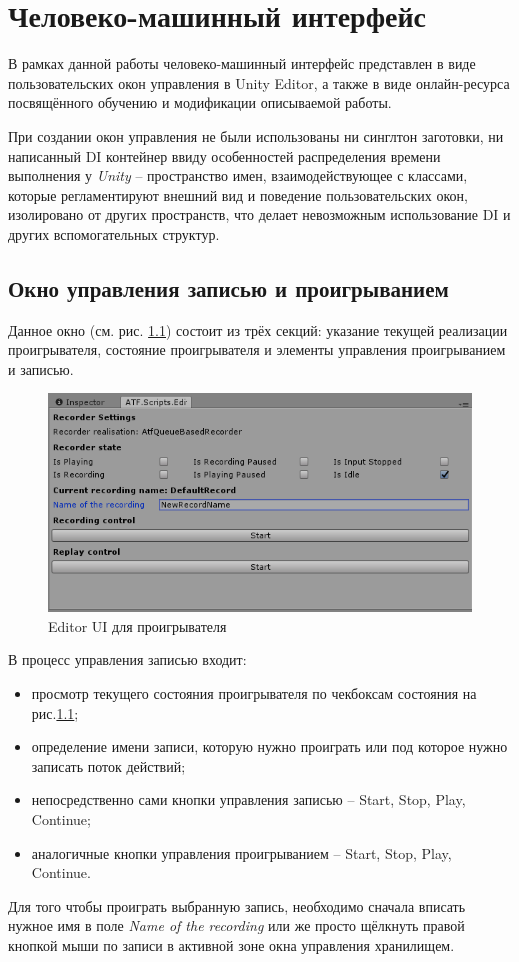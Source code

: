 \chapter{Человеко-машинный интерфейс}

В рамках данной работы человеко-машинный интерфейс представлен в виде пользовательских окон управления в Unity Editor, а также в виде онлайн-ресурса посвящённого обучению и модификации описываемой работы.

\label{cha:ch_3}
При создании окон управления не были использованы ни синглтон заготовки, ни написанный DI контейнер ввиду особенностей распределения времени выполнения у \textit{Unity} -- пространство имен, взаимодействующее с классами, которые регламентируют внешний вид и поведение пользовательских окон, изолировано от других пространств, что делает невозможным использование DI и других вспомогательных структур. 

\section{Окно управления записью и проигрыванием}
Данное окно (см. рис. \ref{recorderUI}) состоит из трёх секций: указание текущей реализации проигрывателя, состояние проигрывателя и элементы управления проигрыванием и записью.

\begin{figure}[h]
	\centering
	\includegraphics[width=0.7\linewidth]{recorder.PNG}
	\caption{Editor UI для проигрывателя}
	\label{recorderUI}
\end{figure}

В процесс управления записью входит:
\begin{itemize}
	\item
	просмотр текущего состояния проигрывателя по чекбоксам состояния на рис.\ref{recorderUI};
	\item
	определение имени записи, которую нужно проиграть или под которое нужно записать поток действий;
	\item
	непосредственно сами кнопки управления записью -- Start, Stop, Play, Continue;
	\item
	аналогичные кнопки управления проигрыванием -- Start, Stop, Play, Continue.
\end{itemize}
Для того чтобы проиграть выбранную запись, необходимо сначала вписать нужное имя в поле \textit{Name of the recording} или же просто щёлкнуть правой кнопкой мыши по записи в активной зоне окна управления хранилищем.

